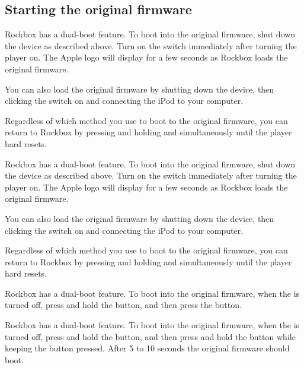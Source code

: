   {
  \subsection{Starting the original firmware}
  \label{ref:Dualboot}
    {
    Rockbox has a dual-boot feature. To boot into the original firmware, shut
    down the device as described above. Turn on the \ButtonHold{} switch
    immediately after turning the player on. The Apple logo will
    display for a few seconds as Rockbox loads the original firmware.
    
    You can also load the original firmware by shutting down the device,
    then clicking the \ButtonHold{} switch on and connecting the iPod
    to your computer.
 
    Regardless of which method you use to boot to the original firmware, you can
    return to Rockbox by pressing and holding \ButtonMenu{} and \ButtonSelect{}
    simultaneously until the player hard resets.
    }

    {
    Rockbox has a dual-boot feature. To boot into the original firmware, shut
    down the device as described above. Turn on the \ButtonHold{} switch
    immediately after turning the player on. The Apple logo will
    display for a few seconds as Rockbox loads the original firmware.
    
    You can also load the original firmware by shutting down the device,
    then clicking the \ButtonHold{} switch on and connecting the iPod
    to your computer.
 
    Regardless of which method you use to boot to the original firmware, you can
    return to Rockbox by pressing and holding \ButtonMenu{} and \ButtonPlay{}
    simultaneously until the player hard resets.
    }

    {
    Rockbox has a dual-boot feature. To boot into the original firmware,
    when the \dap{} is turned off, press and hold the \ButtonRec{} button,
    and then press the \ButtonOn{} button.
    }
    {
    Rockbox has a dual-boot feature. To boot into the original firmware,
    when the \dap{} is turned off, press and hold the \ButtonVolDown{} button,
    and then press and hold the \ButtonPower{} button while keeping the
    \ButtonVolDown{} button pressed. After 5 to 10 seconds the original
    firmware should boot.

}}
